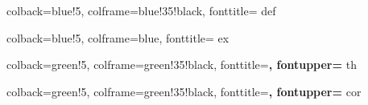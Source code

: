 
%





\theoremstyle{definition}

\newtheorem{ddefinition}[definitioncounter]{}
	{} %
	{colback=blue!5,
	 colframe=blue!35!black,
	 fonttitle=\bfseries}
	{def} %

\newtheorem{dexample}[examplecounter]{\examplename}
	{\examplename} %
	{colback=blue!5,
	 colframe=blue,
	 fonttitle=\bfseries}
	{ex} %


\theoremstyle{plain}

\newtheorem{dtheorem}[theoremcounter]{\theoremname}
	{\theoremname} %
	{colback=green!5,
	 colframe=green!35!black,
	 fonttitle=\bfseries,
	 fontupper=\slshape}
	{th} %

\newtheorem{dcorollary}[theoremcounter]{\corollaryname}
	{\corollaryname} %
	{colback=green!5,
	 colframe=green!35!black,
	 fonttitle=\bfseries,
	 fontupper=\slshape}
	{cor} %

